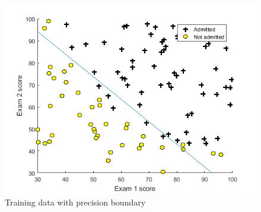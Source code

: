 \documentclass[a4paper,12pt]{report}
\begin{document}
\begin{figure}[H]
\centering
        \includegraphics[totalheight=4 cm]{ex2.png}
				\caption{
				\label{} Training data with precision boundary}
\end{figure}
\end{document}

